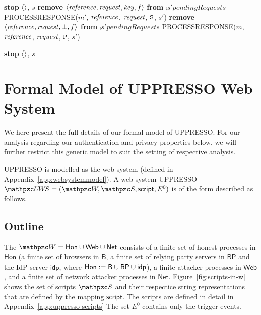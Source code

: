 \begin{algorithmic}[1]
      \State \textbf{stop} $\langle\rangle$, $s$
    \EndIf
    \State \textbf{remove} $\langle\mathit{reference}, \mathit{request}, \mathit{key}, f\rangle$ \textbf{from} $\comp{s'}{pendingRequests}$
    \State \textsf{PROCESSRESPONSE}($m'$, $\mathit{reference}$, $\mathit{request}$, $\mathtt{S}$, $s'$)
    \State \textbf{remove} $\langle\mathit{reference}, \mathit{request}, \bot, f\rangle$ \textbf{from} $\comp{s'}{pendingRequests}$
    \State \textsf{PROCESSRESPONSE}($m$, $\mathit{reference}$, $\mathit{request}$, $\mathtt{P}$, $s'$)
  
  \EndIf
  \State \textbf{stop} $\langle\rangle$, $s$

%
\end{algorithmic} \setlength{\parindent}{1em}



\section{Formal Model of UPPRESSO Web System}
\label{app:model-uppresso}
We here present the full details of our formal model of UPPRESSO. For our analysis regarding our authentication and privacy properties below, we will further restrict this generic model to suit the setting of respective analysis.\par

UPPRESSO is modelled as the web system (defined in Appendix~\ref{app:websystemmodel}). 
A web system UPPRESSO $\uppressowebsystem=(\bidsystem, \scriptset, \mathsf{script}, E^0)$ is of the form described as follows.

\subsection{Outline}\label{app:outlineuppressomodel}
The $\bidsystem=\mathsf{Hon}\cup \mathsf{Web} \cup \mathsf{Net}$ consists of 
a finite set of honest processes in $\mathsf{Hon}$ (a finite set of browsers in $\mathsf{B}$, a finite set of relying party servers in $\mathsf{RP}$ and the IdP server $\mathsf{idp}$, where $\mathsf{Hon} := \mathsf{B} \cup \mathsf{RP} \cup \mathsf{idp}$), a finite attacker processes in  $\mathsf{Web}$, and a finite set of network attacker processes in $\mathsf{Net}$.
Figure~\ref{fig:scripts-in-w} shows the set of scripts $\scriptset$ 
and their respectice string representations that are defined by the 
mapping $\mathsf{script}$. 
The scripts are defined in detail in Appendix~\ref{app:uppresso-scripts}
The set $E^0$ contains only the trigger events.

